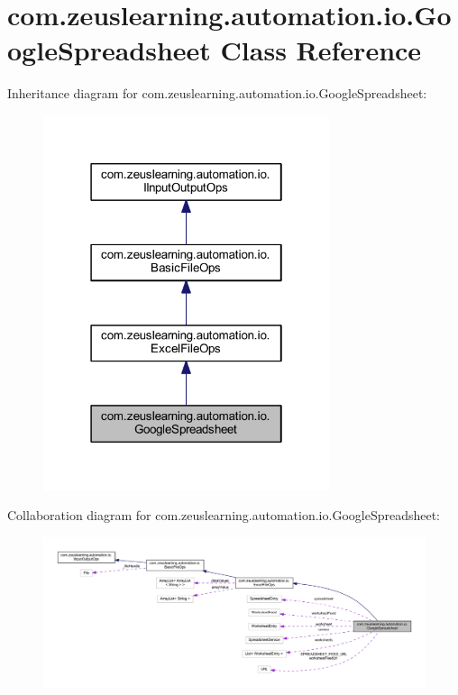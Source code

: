 \hypertarget{classcom_1_1zeuslearning_1_1automation_1_1io_1_1GoogleSpreadsheet}{}\section{com.\+zeuslearning.\+automation.\+io.\+Google\+Spreadsheet Class Reference}
\label{classcom_1_1zeuslearning_1_1automation_1_1io_1_1GoogleSpreadsheet}


Inheritance diagram for com.\+zeuslearning.\+automation.\+io.\+Google\+Spreadsheet\+:\nopagebreak
\begin{figure}[H]
\begin{center}
\leavevmode
\includegraphics[width=238pt]{d2/d13/classcom_1_1zeuslearning_1_1automation_1_1io_1_1GoogleSpreadsheet__inherit__graph}
\end{center}
\end{figure}


Collaboration diagram for com.\+zeuslearning.\+automation.\+io.\+Google\+Spreadsheet\+:
\nopagebreak
\begin{figure}[H]
\begin{center}
\leavevmode
\includegraphics[width=350pt]{d1/d07/classcom_1_1zeuslearning_1_1automation_1_1io_1_1GoogleSpreadsheet__coll__graph}
\end{center}
\end{figure}

